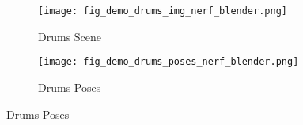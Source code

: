 \begin{figure}[H]
    \centering
    \begin{subfigure}{0.48\linewidth}
        \texttt{[image: fig\_demo\_drums\_img\_nerf\_blender.png]}
        \caption{Drums Scene}
    \end{subfigure}
    \begin{subfigure}{0.48\linewidth}
        \texttt{[image: fig\_demo\_drums\_poses\_nerf\_blender.png]}
        \caption{Drums Poses}
    \end{subfigure}
    \label{fig:dataset_nerf_blender_drums}
\end{figure}
